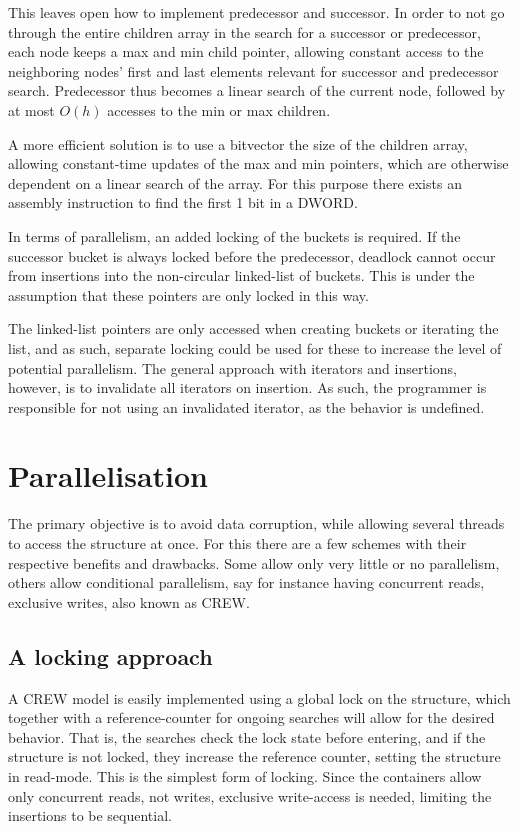 This leaves open how to implement {\keyword predecessor} and {\keyword
successor}. In order to not go through the entire children array in the search
for a {\keyword successor} or {\keyword predecessor}, each node keeps a
{\keyword max} and {\keyword min} child pointer, allowing constant access to
the neighboring nodes' first and last elements relevant for successor and
predecessor search. Predecessor thus becomes a linear search of the current
node, followed by at most $O(h)$ accesses to the {\keyword min} or {\keyword
max} children.

A more efficient solution is to use a bitvector the size of the children array,
allowing constant-time updates of the {\keyword max} and {\keyword min} pointers,
which are otherwise dependent on a linear search of the array. For this purpose
there exists an assembly instruction to find the first 1 bit in a DWORD.

In terms of parallelism, an added locking of the buckets is required. If the
successor bucket is always locked before the predecessor, deadlock cannot occur
from insertions into the non-circular linked-list of buckets. This is under
the assumption that these pointers are only locked in this way.

The linked-list pointers are only accessed when creating buckets or iterating
the list, and as such, separate locking could be used for these to increase
the level of potential parallelism. The general approach with iterators and
insertions, however, is to invalidate all iterators on insertion. As such,
the programmer is responsible for not using an invalidated iterator, as
the behavior is undefined.

\clearpage
\section{Parallelisation}
The primary objective is to avoid data corruption, while allowing several
threads to access the structure at once. For this there are a few schemes with
their respective benefits and drawbacks. Some allow only very little or no
parallelism, others allow conditional parallelism, say for instance having
concurrent reads, exclusive writes, also known as CREW.

\subsection{A locking approach}
A CREW model is easily implemented using a global lock on the structure, which
together with a reference-counter for ongoing searches will allow for the
desired behavior. That is, the searches check the lock state before entering,
and if the structure is not locked, they increase the reference counter,
setting the structure in read-mode. This is the simplest form of locking.
Since the \STL containers allow only concurrent reads, not writes, exclusive
write-access is needed, limiting the insertions to be sequential.

